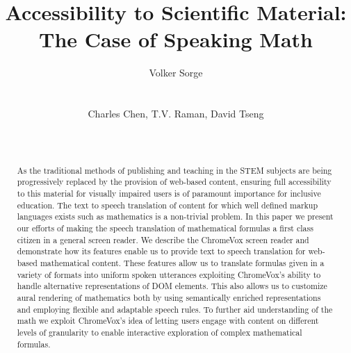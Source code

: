 \documentclass{acm_proc_article-sp}
\begin{document}
\title{Accessibility to Scientific Material:\\ The Case of Speaking Math}

\author{
%
%
  \alignauthor Volker Sorge\\
  \\
  \\
\alignauthor
Charles Chen, T.V. Raman, David Tseng\\
       \\
       \\
}


\maketitle 
\begin{abstract} 
  As the traditional methods of publishing and teaching in the
  STEM subjects are being progressively replaced by the provision
  of web-based content, ensuring full accessibility to this
  material for visually impaired users is of paramount importance
  for inclusive education. The text to speech translation of
  content for which well defined markup languages exists such as
  mathematics is a non-trivial problem. In this paper we present
  our efforts of making the speech translation of mathematical
  formulas a first class citizen in a general screen reader. We
  describe the ChromeVox screen reader and demonstrate how its
  features enable us to provide text to speech translation for
  web-based mathematical content. These features allow us to
  translate formulas given in a variety of formats into uniform
  spoken utterances exploiting ChromeVox's ability to handle
  alternative representations of DOM elements. This also allows
  us to customize aural rendering of mathematics both by using
  semantically enriched representations and employing flexible
  and adaptable speech rules. To further aid understanding of the
  math we exploit ChromeVox's idea of letting users engage with
  content on different levels of granularity to enable
  interactive exploration of complex mathematical formulas.
\end{abstract}
\end{document}
